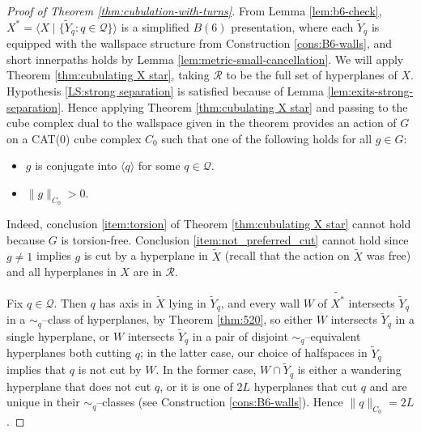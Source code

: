 \documentclass[11pt,oneside]{amsart}
\newcounter{ax}
\theoremstyle{definition}
\begin{document}
\begin{proof}[Proof of Theorem \ref{thm:cubulation-with-turns}]
From Lemma \ref{lem:b6-check}, $X^*=\langle X\mid \{\widetilde Y_q:q\in\mathcal Q\}\rangle$ is a simplified $B(6)$ presentation, where each $\widetilde Y_q$ is equipped with the wallspace structure from Construction \ref{cons:B6-walls}, and short innerpaths holds by Lemma \ref{lem:metric-small-cancellation}.  We will apply Theorem \ref{thm:cubulating X star}, taking $\mathcal R$ to be the full set of hyperplanes of $X$.  Hypothesis \eqref{LS:strong separation} is satisfied because of Lemma \ref{lem:exits-strong-separation}.  Hence applying Theorem \ref{thm:cubulating X star} and passing to the cube complex dual to the wallspace given in the theorem provides an action of $G$ on a CAT(0) cube complex $C_0$ such that one of the following holds for all $g\in G$:
\begin{itemize}
 \item $g$ is conjugate into $\langle q\rangle$ for some $q\in\mathcal Q$.
 \item $\|g\|_{C_0}>0$.
\end{itemize}
Indeed, conclusion \eqref{item:torsion} of Theorem \ref{thm:cubulating X star} cannot hold because $G$ is torsion-free.  Conclusion \eqref{item:not_preferred_cut} cannot hold since $g\neq 1$ implies $g$ is cut by a hyperplane in $\widetilde X$ (recall that the action on $\widetilde X$ was free) and all hyperplanes in $X$ are in $\mathcal R$.

Fix $q\in\mathcal Q$.  Then $q$ has axis in $\widetilde X$ lying in $\widetilde Y_q$, and every wall $W$ of $\widetilde{X^*}$ intersects $\widetilde Y_q$ in a $\sim_q$--class of hyperplanes, by Theorem \ref{thm:520}, so either $W$ intersects $\widetilde Y_q$ in a single hyperplane, or $W$ intersects $\widetilde Y_q$ in a pair of disjoint $\sim_q$--equivalent hyperplanes both cutting $q$; in the latter case, our choice of halfspaces in $\widetilde Y_q$ implies that $q$ is not cut by $W$.  In the former case, $W\cap\widetilde Y_q$ is either a wandering hyperplane that does not cut $q$, or it is one of $2L$ hyperplanes that cut $q$ and are unique in their $\sim_q$--classes (see Construction \ref{cons:B6-walls}).  Hence $\|q\|_{C_0}=2L$.  


\end{proof}
\end{document}
